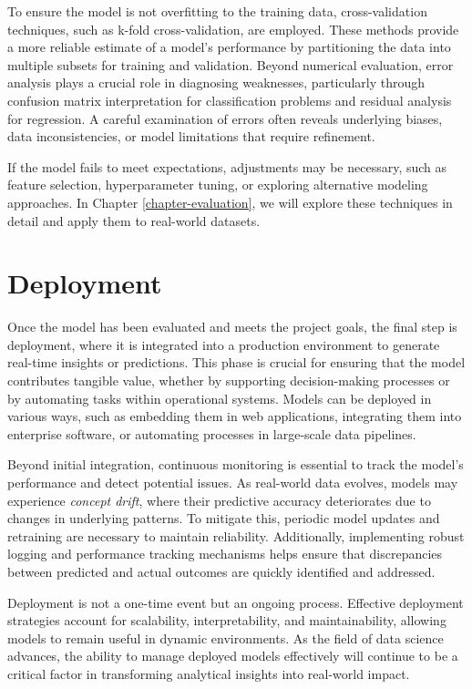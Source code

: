 \documentclass[
]{book}
\theoremstyle{definition}
\theoremstyle{definition}
\theoremstyle{definition}
\theoremstyle{definition}
\theoremstyle{remark}
\begin{document}
To ensure the model is not overfitting to the training data, cross-validation techniques, such as k-fold cross-validation, are employed. These methods provide a more reliable estimate of a model's performance by partitioning the data into multiple subsets for training and validation. Beyond numerical evaluation, error analysis plays a crucial role in diagnosing weaknesses, particularly through confusion matrix interpretation for classification problems and residual analysis for regression. A careful examination of errors often reveals underlying biases, data inconsistencies, or model limitations that require refinement.

If the model fails to meet expectations, adjustments may be necessary, such as feature selection, hyperparameter tuning, or exploring alternative modeling approaches. In Chapter \ref{chapter-evaluation}, we will explore these techniques in detail and apply them to real-world datasets.

\section{Deployment}\label{deployment}

Once the model has been evaluated and meets the project goals, the final step is deployment, where it is integrated into a production environment to generate real-time insights or predictions. This phase is crucial for ensuring that the model contributes tangible value, whether by supporting decision-making processes or by automating tasks within operational systems. Models can be deployed in various ways, such as embedding them in web applications, integrating them into enterprise software, or automating processes in large-scale data pipelines.

Beyond initial integration, continuous monitoring is essential to track the model's performance and detect potential issues. As real-world data evolves, models may experience \emph{concept drift}, where their predictive accuracy deteriorates due to changes in underlying patterns. To mitigate this, periodic model updates and retraining are necessary to maintain reliability. Additionally, implementing robust logging and performance tracking mechanisms helps ensure that discrepancies between predicted and actual outcomes are quickly identified and addressed.

Deployment is not a one-time event but an ongoing process. Effective deployment strategies account for scalability, interpretability, and maintainability, allowing models to remain useful in dynamic environments. As the field of data science advances, the ability to manage deployed models effectively will continue to be a critical factor in transforming analytical insights into real-world impact.
\end{document}

